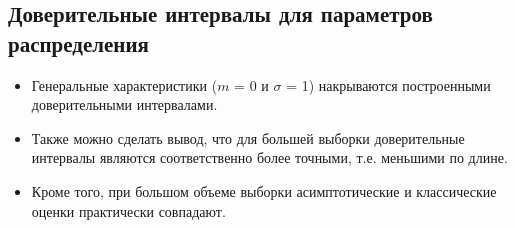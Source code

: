  \subsection{Доверительные интервалы для параметров распределения}
 \begin{itemize}
    \item Генеральные характеристики ($m$ = 0 и $\sigma$ = 1) накрываются построенными доверительными интервалами.
    \item Также можно сделать вывод, что для большей выборки доверительные интервалы являются соответственно более точными, т.е. меньшими по длине.
    \item Кроме того, при большом объеме выборки асимптотические и классические оценки практически совпадают.
\end{itemize}